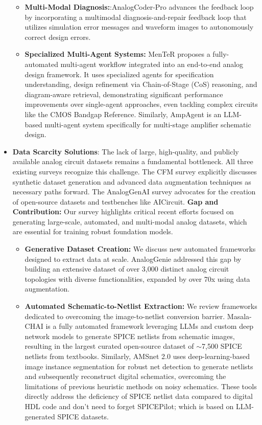 \documentclass{ieeeaccess}
\begin{document}
\begin{itemize}
        \begin{itemize}
        \item \textbf{Multi-Modal Diagnosis:}:AnalogCoder-Pro advances the feedback loop by incorporating a multimodal diagnosis-and-repair feedback loop that utilizes simulation error messages and waveform images to autonomously correct design errors.
        \item \textbf{Specialized Multi-Agent Systems:} MenTeR proposes a fully-automated multi-agent workflow integrated into an end-to-end analog design framework. It uses specialized agents for specification understanding, design refinement via Chain-of-Stage (CoS) reasoning, and diagram-aware retrieval, demonstrating significant performance improvements over single-agent approaches, even tackling complex circuits like the CMOS Bandgap Reference. Similarly, AmpAgent is an LLM-based multi-agent system specifically for multi-stage amplifier schematic design.
    \end{itemize}
    \item \textbf{Data Scarcity Solutions}: The lack of large, high-quality, and publicly available analog circuit datasets remains a fundamental bottleneck.
    \newline
    All three existing surveys recognize this challenge. The CFM survey explicitly discusses synthetic dataset generation and advanced data augmentation techniques as necessary paths forward. The AnalogGenAI survey advocates for the creation of open-source datasets and testbenches like AICircuit.
    \newline
    \textbf{Gap and Contribution:} Our survey highlights critical recent efforts focused on generating large-scale, automated, and multi-modal analog datasets, which are essential for training robust foundation models.
    \begin{itemize}
        \item \textbf{Generative Dataset Creation:} We discuss new automated frameworks designed to extract data at scale. AnalogGenie addressed this gap by building an extensive dataset of over 3,000 distinct analog circuit topologies with diverse functionalities, expanded by over 70x using data augmentation.
        \item \textbf{Automated Schematic-to-Netlist Extraction:} We review frameworks dedicated to overcoming the image-to-netlist conversion barrier. Masala-CHAI is a fully automated framework leveraging LLMs and custom deep network models to generate SPICE netlists from schematic images, resulting in the largest curated open-source dataset of $\sim$7,500 SPICE netlists from textbooks. Similarly, AMSnet 2.0 uses deep-learning-based image instance segmentation for robust net detection to generate netlists and subsequently reconstruct digital schematics, overcoming the limitations of previous heuristic methods on noisy schematics. These tools directly address the deficiency of SPICE netlist data compared to digital HDL code and don't need to forget SPICE\-Pilot; which is based on LLM-generated SPICE datasets.
    \end{itemize}
    \end{itemize}
\end{document}
